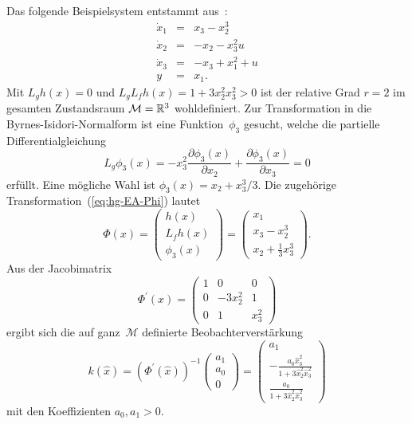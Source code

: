 \begin{example}
\label{exa:isidori434-HG-BI-NF}Das folgende Beispielsystem entstammt
aus~\cite[S.~{167}]{isidori3}:
\begin{equation}
\begin{array}{lcl}
\dot{x}_{1} & = & x_{3}-x_{2}^{3}\\
\dot{x}_{2} & = & -x_{2}-x_{3}^{2}u\\
\dot{x}_{3} & = & -x_{3}+x_{1}^{2}+u\\
y & = & x_{1}.
\end{array}\label{eq:isidori434-system}
\end{equation}
Mit $L_{g}h(x)=0$ und $L_{g}L_{f}h(x)=1+3x_{2}^{2}x_{3}^{2}>0$ ist
der relative Grad $r=2$ im gesamten Zustandsraum $\mathcal{M}={\mathbb{R}}^{3}$
wohldefiniert. Zur Transformation in die Byrnes-Isidori-Normalform
ist eine Funktion~$\phi_{3}$ gesucht, welche die partielle Differentialgleichung
\[
L_{g}\phi_{3}(x)=-x_{3}^{2}\frac{\partial\phi_{3}(x)}{\partial x_{2}}+\frac{\partial\phi_{3}(x)}{\partial x_{3}}=0
\]
erfüllt. Eine mögliche Wahl ist $\phi_{3}(x)=x_{2}+x_{3}^{3}/3$.
Die zugehörige Transformation~(\ref{eq:hg-EA-Phi}) lautet 
\[
\Phi(x)=\left(\begin{array}{c}
h(x)\\
L_{f}h(x)\\
\phi_{3}(x)
\end{array}\right)=\left(\begin{array}{c}
x_{1}\\
x_{3}-x_{2}^{3}\\
x_{2}+\frac{1}{3}x_{3}^{3}
\end{array}\right).
\]
Aus der Jacobimatrix
\begin{equation}
\Phi^{\prime}(x)=\left(\begin{array}{ccc}
1 & 0 & 0\\
0 & -3x_{2}^{2} & 1\\
0 & 1 & x_{3}^{2}
\end{array}\right)\label{eq:isidori434-dPhi}
\end{equation}
ergibt sich die auf ganz~$\mathcal{M}$ definierte Beobachterverstärkung
\begin{equation}
k(\hat{x})=\left(\Phi^{\prime}(\hat{x})\right)^{-1}\left(\begin{array}{c}
a_{1}\\
a_{0}\\
0
\end{array}\right)=\left(\begin{array}{c}
a_{1}\\
-\frac{a_{0}\hat{x}_{3}^{2}}{1+3\hat{x}_{2}^{2}\hat{x}_{3}^{2}}\\
\frac{a_{0}}{1+3\hat{x}_{2}^{2}\hat{x}_{3}^{2}}
\end{array}\right)\label{eq:isidori434-k-BINF}
\end{equation}
mit den Koeffizienten $a_{0},a_{1}>0$.
\end{example}

